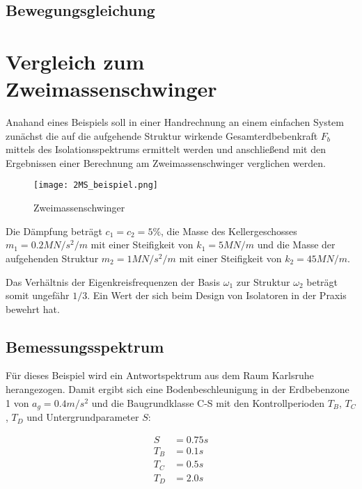 \subsection{Bewegungsgleichung}



\pagebreak








\section{Vergleich zum Zweimassenschwinger}
\label{sec:vergleich}

Anahand eines Beispiels soll in einer Handrechnung an einem einfachen System zunächst die auf die aufgehende Struktur wirkende Gesamterdbebenkraft $F_b$ mittels des Isolationsspektrums ermittelt werden und anschließend mit den Ergebnissen einer Berechnung am Zweimassenschwinger verglichen werden.

\begin{figure}[ht]
    \centering
    \texttt{[image: 2MS\_beispiel.png]}
    \caption{Zweimassenschwinger}
    \label{fig:2ms}
\end{figure}

Die Dämpfung beträgt $c_1 = c_2 = 5\%$, die Masse des Kellergeschosses $m_1 = 0.2 MN/s^2/m$ mit einer Steifigkeit von $k_1 = 5 MN/m$ und die Masse der aufgehenden Struktur $m_2 = 1 MN/s^2/m$ mit einer Steifigkeit von $k_2 = 45 MN/m$.

Das Verhältnis der Eigenkreisfrequenzen der Basis $\omega_1$ zur Struktur $\omega_2$ beträgt somit ungefähr $1/3$. Ein Wert der sich beim Design von Isolatoren in der Praxis bewehrt hat.

\subsection{Bemessungsspektrum}

Für dieses Beispiel wird ein Antwortspektrum aus dem Raum Karlsruhe herangezogen. Damit ergibt sich eine Bodenbeschleunigung in der Erdbebenzone 1 von $a_g = 0.4 m/s^2$ und die Baugrundklasse C-S mit den Kontrollperioden $T_B$, $T_C$, $T_D$ und Untergrundparameter $S$:

\begin{align*}
S &= 0.75 s\\
T_B &= 0.1 s\\
T_C &= 0.5 s\\
T_D &= 2.0 s
\end{align*}

